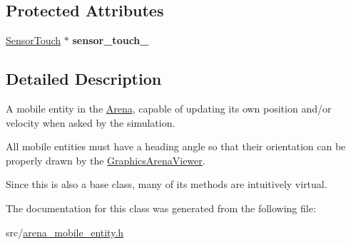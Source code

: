 \subsection*{Protected Attributes}
\begin{DoxyCompactItemize}
\item 
\mbox{\label{class_arena_mobile_entity_a260fd3fba196ee9ab56f9f2ce6ab4a21}} 
\mbox{\hyperlink{class_sensor_touch}{Sensor\+Touch}} $\ast$ {\bfseries sensor\+\_\+touch\+\_\+}
\end{DoxyCompactItemize}


\subsection{Detailed Description}
A mobile entity in the \mbox{\hyperlink{class_arena}{Arena}}, capable of updating its own position and/or velocity when asked by the simulation. 

All mobile entities must have a heading angle so that their orientation can be properly drawn by the \mbox{\hyperlink{class_graphics_arena_viewer}{Graphics\+Arena\+Viewer}}.

Since this is also a base class, many of its methods are intuitively {\ttfamily virtual}. 

The documentation for this class was generated from the following file\+:\begin{DoxyCompactItemize}
\item 
src/\mbox{\hyperlink{arena__mobile__entity_8h}{arena\+\_\+mobile\+\_\+entity.\+h}}\end{DoxyCompactItemize}
